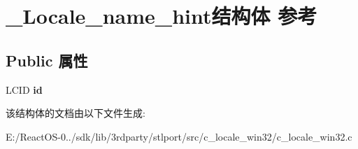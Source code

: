 \hypertarget{struct___locale__name__hint}{}\section{\+\_\+\+Locale\+\_\+name\+\_\+hint结构体 参考}
\label{struct___locale__name__hint}
\subsection*{Public 属性}
\begin{DoxyCompactItemize}
\item 
\mbox{\label{struct___locale__name__hint_ad23c23541b96b9328a401b9bed6219f7}} 
L\+C\+ID {\bfseries id}
\end{DoxyCompactItemize}


该结构体的文档由以下文件生成\+:\begin{DoxyCompactItemize}
\item 
E\+:/\+React\+O\+S-\/0../sdk/lib/3rdparty/stlport/src/c\+\_\+locale\+\_\+win32/c\+\_\+locale\+\_\+win32.\+c\end{DoxyCompactItemize}
